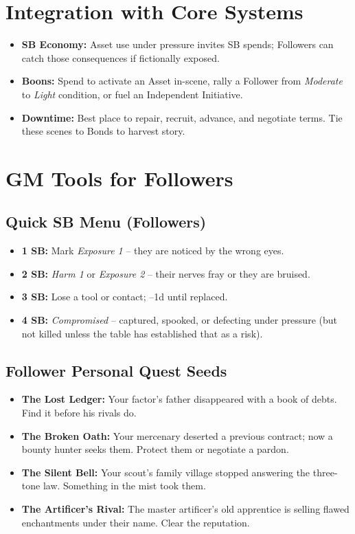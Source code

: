 \section{Integration with Core Systems}
\begin{itemize}
  \item \textbf{SB Economy:} Asset use under pressure invites SB spends; Followers can catch those consequences if fictionally exposed.
  \item \textbf{Boons:} Spend to activate an Asset in-scene, rally a Follower from \emph{Moderate} to \emph{Light} condition, or fuel an Independent Initiative.
  \item \textbf{Downtime:} Best place to repair, recruit, advance, and negotiate terms. Tie these scenes to Bonds to harvest story.
\end{itemize}

\section{GM Tools for Followers}

\subsection*{Quick SB Menu (Followers)}
\begin{itemize}
  \item \textbf{1 SB:} Mark \emph{Exposure 1} -- they are noticed by the wrong eyes.
  \item \textbf{2 SB:} \emph{Harm 1} or \emph{Exposure 2} -- their nerves fray or they are bruised.
  \item \textbf{3 SB:} Lose a tool or contact; --1d until replaced.
  \item \textbf{4 SB:} \emph{Compromised} -- captured, spooked, or defecting under pressure (but not killed unless the table has established that as a risk).
\end{itemize}

\subsection*{Follower Personal Quest Seeds}
\begin{itemize}
  \item \textbf{The Lost Ledger:} Your factor's father disappeared with a book of debts. Find it before his rivals do.
  \item \textbf{The Broken Oath:} Your mercenary deserted a previous contract; now a bounty hunter seeks them. Protect them or negotiate a pardon.
  \item \textbf{The Silent Bell:} Your scout's family village stopped answering the three-tone law. Something in the mist took them.
  \item \textbf{The Artificer's Rival:} The master artificer's old apprentice is selling flawed enchantments under their name. Clear the reputation.
\end{itemize}

